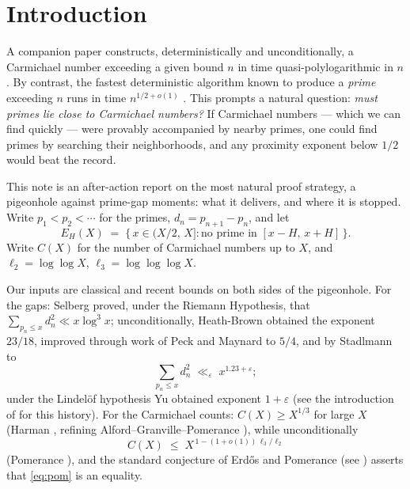 \documentclass[11pt]{amsart}
\newcommand{\llog}{\log\log}
\newcommand{\lllog}{\log\log\log}
\newcommand{\CC}{C}
\begin{document}
\maketitle

\section{Introduction}
\label{sec:intro}

A companion paper \cite{Bro} constructs, deterministically and unconditionally,
a Carmichael number exceeding a given bound $n$ in time quasi-polylogarithmic in
$n$. By contrast, the fastest deterministic algorithm known to produce a
\emph{prime} exceeding $n$ runs in time $n^{1/2+o(1)}$ \cite{LO, Pol}. This
prompts a natural question: \emph{must primes lie close to
Carmichael numbers?} If Carmichael numbers --- which we can find quickly ---
were provably accompanied by nearby primes, one could find primes by searching
their neighborhoods, and any proximity exponent below $1/2$ would beat the
record.

This note is an after-action report on the most natural proof strategy, a
pigeonhole against prime-gap moments: what it delivers, and where it is
stopped. Write $p_1 < p_2 < \cdots$ for the
primes, $d_n = p_{n+1} - p_n$, and let
\[
E_H(X) \;=\; \{\, x \in (X/2,\, X] : \text{no prime in } [x - H,\, x + H] \,\}.
\]
Write $\CC(X)$ for the number of Carmichael numbers up to $X$, and
$\ell_2 = \llog X$, $\ell_3 = \lllog X$.

Our inputs are classical and recent bounds on both sides of the pigeonhole.
For the gaps: Selberg \cite{Sel} proved, under the Riemann Hypothesis, that
$\sum_{p_n \le x} d_n^2 \ll x \log^3 x$; unconditionally, Heath-Brown
\cite{HB} obtained the exponent $23/18$, improved through work of Peck and
Maynard to $5/4$, and by Stadlmann \cite{Sta} to
\begin{equation}
\label{eq:sta}
\sum_{p_n \le x} d_n^2 \;\ll_\varepsilon\; x^{1.23 + \varepsilon};
\end{equation}
under the Lindel\"of hypothesis Yu obtained exponent $1 + \varepsilon$ (see the
introduction of \cite{Sta} for this history). For the Carmichael counts:
$\CC(X) \ge X^{1/3}$ for large $X$ (Harman \cite{Har}, refining
Alford--Granville--Pomerance \cite{AGP}), while unconditionally
\begin{equation}
\label{eq:pom}
\CC(X) \;\le\; X^{\,1 - (1+o(1))\,\ell_3/\ell_2}
\end{equation}
(Pomerance \cite{Pom}), and the standard conjecture of Erd\H{o}s and Pomerance
(see \cite{Erd, GP}) asserts that \eqref{eq:pom} is an equality.
\end{document}
